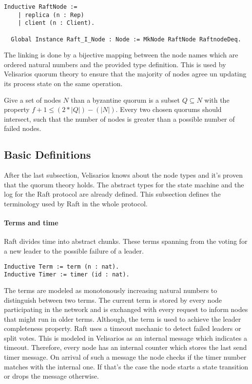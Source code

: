 \begin{lstlisting}[style=coq,label=lst:nodes,
caption=The different kinds of raft nodes.]
  Inductive RaftNode :=
    | replica (n : Rep)
    | client (n : Client).

  Global Instance Raft_I_Node : Node := MkNode RaftNode RaftnodeDeq.
\end{lstlisting}

The linking is done by a bijective mapping between the node names which are
ordered natural numbers and the provided type definition. This is used by
Velisarios quorum theory to ensure that the majority of nodes agree
un updating its process state on the same operation.~\cite{rahli2018velisarios}

\begin{defi}
  Give a set of nodes $N$ than a byzantine quorum is a subset $Q\subseteq N$ with the
  property $f + 1\leq (2*|Q|)-(|N|)$. Every two chosen quorums should intersect,
  such that the number of nodes is greater than a possible number of failed
  nodes.
\end{defi}

\subsection{Basic Definitions}
After the last subsection, Velisarios knows about the node types and it's proven
that the quorum theory holds. The abstract types for the state machine and the log
for the Raft protocol are already defined. This subsection defines the
terminology used by Raft in the whole protocol.

\paragraph{Terms and time}
Raft divides time into abstract chunks. These terms spanning from the
voting for a new leader to the possible failure of a leader.

\begin{lstlisting}[style=coq,label=lst:terms,
caption=The definition of terms and timer.]
Inductive Term := term (n : nat).
Inductive Timer := timer (id : nat).
\end{lstlisting}

The terms are modeled as monotonously increasing natural numbers to
distinguish between two terms. The current term is stored by every node
participating in the network and is exchanged with every request to
inform nodes that might run in older terms. Although, the term is used
to achieve the leader completeness property.
Raft uses a timeout mechanic to detect failed leaders or split
votes. This is modeled in Velisarios as an internal message which
indicates a timeout. Therefore, every node has an internal counter
which stores the last send timer message. On arrival of such a message
the node checks if the timer number matches with the internal one. If
that's the case the node starts a state transition or drops the message
otherwise.

